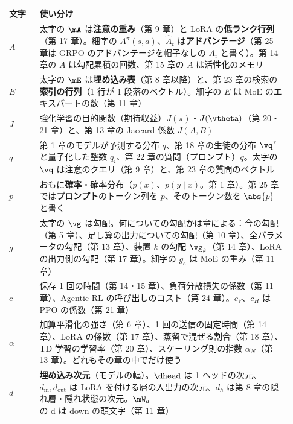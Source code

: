 \par\medskip\noindent\begin{minipage}{\linewidth}
\centering\footnotesize
{}
\label{tab:notation-overload2}
\begin{tabular}{>{\raggedright\arraybackslash}p{0.10\linewidth}>{\raggedright\arraybackslash}p{0.83\linewidth}}
\toprule
文字 & 使い分け \\
\midrule
$A$ & 太字の $\mA$ は\textbf{注意の重み}（第 9 章）と LoRA の\textbf{低ランク行列}（第 17 章）。細字の $A^\pi(s,a)$、$\hat A_t$ は\textbf{アドバンテージ}（第 25 章は GRPO のアドバンテージを帽子なしの $A_i$ と書く）。第 14 章の $A$ は勾配累積の回数、第 15 章の $A$ は活性化のメモリ \\
$E$ & 太字の $\mE$ は\textbf{埋め込み表}（第 8 章以降）と、第 23 章の検索の\textbf{索引の行列}（1 行が 1 段落のベクトル）。細字の $E$ は MoE のエキスパートの数（第 11 章） \\
$J$ & 強化学習の目的関数（期待収益）$J(\pi)$・$J(\vtheta)$（第 20・21 章）と、第 13 章の Jaccard 係数 $J(A,B)$ \\
$q$ & 第 1 章のモデルが予測する分布 $q$、第 18 章の生徒の分布 $\vq^\tau$ と量子化した整数 $q_i$、第 22 章の質問（プロンプト）$q$。太字の $\vq$ は注意のクエリ（第 9 章）と、第 23 章の質問のベクトル \\
$p$ & おもに\textbf{確率}・確率分布（$p(x)$、$p(y\mid x)$。第 1 章）。第 25 章では\textbf{プロンプト}のトークン列を $p$、そのトークン数を $\abs{p}$ と書く \\
$g$ & 太字の $\vg$ は勾配。何についての勾配かは章による：今の勾配（第 5 章）、足し算の出力についての勾配（第 10 章）、全パラメータの勾配（第 13 章）、装置 $k$ の勾配 $\vg_k$（第 14 章）、LoRA の出力側の勾配（第 17 章）。細字の $g_e$ は MoE の重み（第 11 章） \\
$c$ & 保存 1 回の時間（第 14・15 章）、負荷分散損失の係数（第 11 章）、Agentic RL の呼び出しのコスト（第 24 章）。$c_V$、$c_H$ は PPO の係数（第 21 章） \\
$\alpha$ & 加算平滑化の強さ（第 6 章）、1 回の送信の固定時間（第 14 章）、LoRA の係数（第 17 章）、蒸留で混ぜる割合（第 18 章）、TD 学習の学習率（第 20 章）、スケーリング則の指数 $\alpha_N$（第 13 章）。どれもその章の中でだけ使う \\
$d$ & \textbf{埋め込み次元}（モデルの幅）。$\dhead$ は 1 ヘッドの次元、$d_{\text{in}},d_{\text{out}}$ は LoRA を付ける層の入出力の次元、$d_h$ は第 8 章の隠れ層・隠れ状態の次元。$\mW_d$ の d は down の頭文字（第 11 章） \\

\end{tabular}
\end{minipage}
